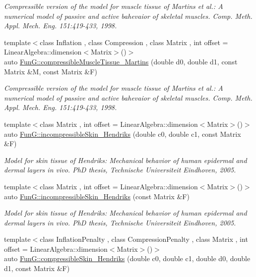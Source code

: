 \begin{DoxyCompactItemize}
\begin{DoxyCompactList}\small\item\em Compressible version of the model for muscle tissue of Martins et al.\-: A numerical model of passive and active bahevaior of skeletal muscles. Comp. Meth. Appl. Mech. Eng. 151\-:419-\/433, 1998. \end{DoxyCompactList}\item 
{\footnotesize template$<$class Inflation , class Compression , class Matrix , int offset = Linear\-Algebra\-::dimension$<$\-Matrix$>$()$>$ }\\auto \hyperlink{group__Biomechanics_ga46a70ccb2285e12addad87b6a8aaaae8}{Fun\-G\-::compressible\-Muscle\-Tissue\-\_\-\-Martins} (double d0, double d1, const Matrix \&M, const Matrix \&F)
\begin{DoxyCompactList}\small\item\em Compressible version of the model for muscle tissue of Martins et al.\-: A numerical model of passive and active bahevaior of skeletal muscles. Comp. Meth. Appl. Mech. Eng. 151\-:419-\/433, 1998. \end{DoxyCompactList}\item 
{\footnotesize template$<$class Matrix , int offset = Linear\-Algebra\-::dimension$<$\-Matrix$>$()$>$ }\\auto \hyperlink{group__Biomechanics_gaa20bf15ef6976d64d89490429035b2c4}{Fun\-G\-::incompressible\-Skin\-\_\-\-Hendriks} (double c0, double c1, const Matrix \&F)
\begin{DoxyCompactList}\small\item\em Model for skin tissue of Hendriks\-: Mechanical behavior of human epidermal and dermal layers in vivo. Ph\-D thesis, Technische Universiteit Eindhoven, 2005. \end{DoxyCompactList}\item 
{\footnotesize template$<$class Matrix , int offset = Linear\-Algebra\-::dimension$<$\-Matrix$>$()$>$ }\\auto \hyperlink{group__Biomechanics_gad8653218bd2afb4e3cfd601a5142956c}{Fun\-G\-::incompressible\-Skin\-\_\-\-Hendriks} (const Matrix \&F)
\begin{DoxyCompactList}\small\item\em Model for skin tissue of Hendriks\-: Mechanical behavior of human epidermal and dermal layers in vivo. Ph\-D thesis, Technische Universiteit Eindhoven, 2005. \end{DoxyCompactList}\item 
{\footnotesize template$<$class Inflation\-Penalty , class Compression\-Penalty , class Matrix , int offset = Linear\-Algebra\-::dimension$<$\-Matrix$>$()$>$ }\\auto \hyperlink{group__Biomechanics_ga07b4c52c6ecf7e72f73ab5832fb262cd}{Fun\-G\-::compressible\-Skin\-\_\-\-Hendriks} (double c0, double c1, double d0, double d1, const Matrix \&F)

\end{DoxyCompactItemize}
